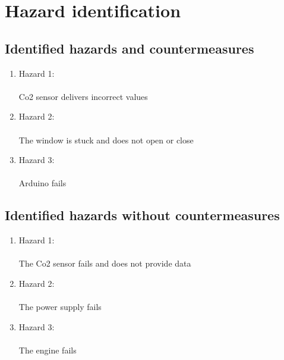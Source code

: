 \section{Hazard identification}
\label{chapter4}

\subsection{Identified hazards and countermeasures}


	\begin{enumerate}
		\item Hazard 1: \\
            \\	Co2 sensor delivers incorrect values  \\
		\item Hazard 2: \\
            \\	The window is stuck and does not open or close \\
		\item Hazard 3: \\
            \\	Arduino fails \\
	\end{enumerate}
	
\subsection{Identified hazards without countermeasures }

	\begin{enumerate}
		\item Hazard 1: \\
            \\	The Co2 sensor fails and does not provide data \\
		\item Hazard 2: \\
            \\	The power supply fails \\
		\item Hazard 3: \\
            \\	The engine fails \\
	\end{enumerate}